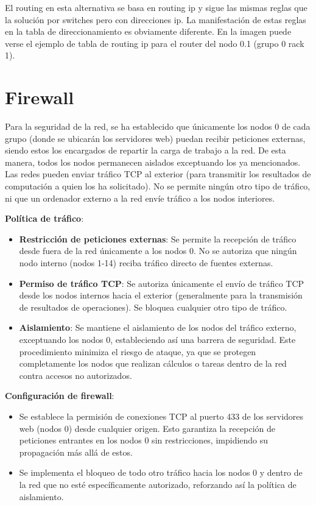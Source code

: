 \documentclass[%
    school=etsisi,%
    degree=61TI,%
]{upm-report}
\begin{document}
El routing en esta alternativa se basa en routing ip y sigue las mismas reglas que la solución por switches pero con direcciones ip. La manifestación de estas reglas en la tabla de direccionamiento es obviamente diferente. En la imagen puede verse el ejemplo de tabla de routing ip para el router del nodo 0.1 (grupo 0 rack 1).

\section{Firewall}

Para la seguridad de la red, se ha establecido que únicamente los nodos 0 de cada grupo (donde se ubicarán los servidores web) puedan recibir peticiones externas, siendo estos los encargados de repartir la carga de trabajo a la red. De esta manera, todos los nodos permanecen aislados exceptuando los ya mencionados. Las redes pueden enviar tráfico TCP al exterior (para transmitir los resultados de computación a quien los ha solicitado). No se permite ningún otro tipo de tráfico, ni que un ordenador externo a la red envíe tráfico a los nodos interiores.

\textbf{Política de tráfico}:
\begin{itemize}
    \item \textbf{Restricción de peticiones externas}: Se permite la recepción de tráfico desde fuera de la red únicamente a los nodos 0. No se autoriza que ningún nodo interno (nodos 1-14) reciba tráfico directo de fuentes externas.
    \item \textbf{Permiso de tráfico TCP}: Se autoriza únicamente el envío de tráfico TCP desde los nodos internos hacia el exterior (generalmente para la transmisión de resultados de operaciones). Se bloquea cualquier otro tipo de tráfico.
    \item \textbf{Aislamiento}: Se mantiene el aislamiento de los nodos del tráfico externo, exceptuando los nodos 0, estableciendo así una barrera de seguridad. Este procedimiento minimiza el riesgo de ataque, ya que se protegen completamente los nodos que realizan cálculos o tareas dentro de la red contra accesos no autorizados.
\end{itemize}

\textbf{Configuración de firewall}:
\begin{itemize}
    \item Se establece la permisión de conexiones TCP al puerto 433 de los servidores web (nodos 0) desde cualquier origen. Esto garantiza la recepción de peticiones entrantes en los nodos 0 sin restricciones, impidiendo su propagación más allá de estos.
    \item Se implementa el bloqueo de todo otro tráfico hacia los nodos 0 y dentro de la red que no esté específicamente autorizado, reforzando así la política de aislamiento.
\end{itemize}
\end{document}
